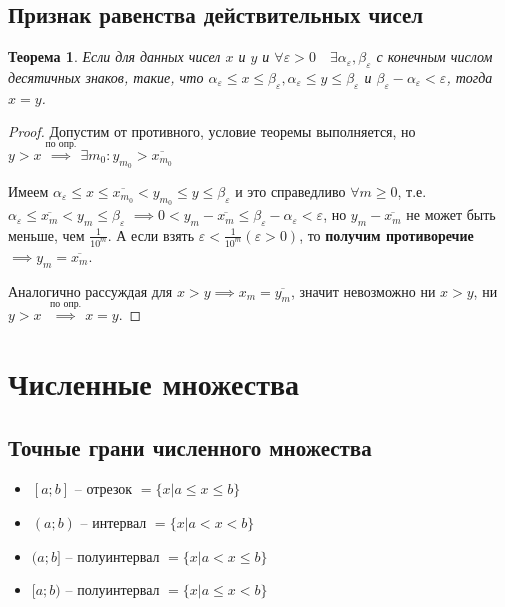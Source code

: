 \documentclass[a4paper,oneside]{article}
\newcommand{\bydef}{\stackrel{\text{по опр.}}{\implies}} %
\newtheorem{theorem}{Теорема}[subsection]
\begin{document}
\subsection{Признак равенства действительных чисел}

\begin{theorem}
    Если для данных чисел $x$ и $y$ и 
    $\forall \varepsilon > 0 \quad \exists \alpha_{\varepsilon}, \beta_{\varepsilon}$
    с конечным числом десятичных знаков, такие, что
    $\alpha_{\varepsilon} \le x \le \beta_{\varepsilon}, \alpha_{\varepsilon} \le y \le \beta_{\varepsilon}$
    и $\beta_{\varepsilon} - \alpha_{\varepsilon} < \varepsilon$, тогда $x = y$.
\end{theorem}

\begin{proof}
    Допустим от противного, условие теоремы выполняется, но 
    $y > x \bydef \exists m_0: y_{m_0} > \overline{x_{m_0}}$

    Имеем $\alpha_{\varepsilon} \le x \le \overline{x_{m_0}} < y_{m_0} \le y \le \beta_{\varepsilon}$
    и это справедливо $\forall m \ge 0$, т.е. 
    $\alpha_{\varepsilon} \le \overline{x_m} < y_m \le \beta_{\varepsilon}$
    $\implies 0 < y_m - \overline{x_m} \le \beta_\varepsilon - \alpha_\varepsilon < \varepsilon$,
    но $y_m - \overline{x_m}$ не может быть меньше, чем $\frac{1}{10^m}$. А если взять
    $\varepsilon < \frac{1}{10^m} (\varepsilon > 0)$, то \textbf{получим противоречие}
    $\implies y_m = \overline{x_m}$.

    Аналогично рассуждая для $x > y \implies x_m = \overline{y_m}$, значит невозможно
    ни $x > y$, ни $y > x$ $\bydef x = y$.
\end{proof}

\section{Численные множества}

\subsection{Точные грани численного множества}

\begin{itemize}
    \item $[a;b]$ -- отрезок $= \{x | a \le x \le b\}$
    \item $(a;b)$ -- интервал $= \{x | a < x < b\}$
    \item $(a;b]$ -- полуинтервал $= \{x | a < x \le b\}$
    \item $[a;b)$ -- полуинтервал $= \{x | a \le x < b\}$
\end{itemize}
\end{document}
